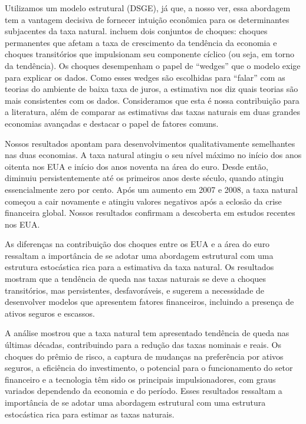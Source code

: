 Utilizamos um modelo estrutural (DSGE), já que, a nosso ver, essa abordagem tem a vantagem decisiva de fornecer intuição econômica para os determinantes subjacentes da taxa natural. incluem dois conjuntos de choques: choques permanentes que afetam a taxa de crescimento da tendência da economia e choques transitórios que impulsionam seu componente cíclico (ou seja, em torno da tendência). Os choques desempenham o papel de “wedges” que o modelo exige para explicar os dados. Como esses wedges são escolhidas para “falar” com as teorias do ambiente de baixa taxa de juros, a estimativa nos diz quais teorias são mais consistentes com os dados. Consideramos que esta é nossa contribuição para a literatura, além de comparar as estimativas das taxas naturais em duas grandes economias avançadas e destacar o papel de fatores comuns.

Nossos resultados apontam para desenvolvimentos qualitativamente semelhantes nas duas economias. A taxa natural atingiu o seu nível máximo no início dos anos oitenta nos EUA e início dos anos noventa na área do euro. Desde então, diminuiu persistentemente até os primeiros anos deste século, quando atingiu essencialmente zero por cento. Após um aumento em 2007 e 2008, a taxa natural começou a cair novamente e atingiu valores negativos após a eclosão da crise financeira global. Nossos resultados confirmam a descoberta em estudos recentes nos EUA.

As diferenças na contribuição dos choques entre os EUA e a área do euro ressaltam a importância de se adotar uma abordagem estrutural com uma estrutura estocástica rica para a estimativa da taxa natural. Os resultados mostram que a tendência de queda nas taxas naturais se deve a choques transitórios, mas persistentes, desfavoráveis, e sugerem a necessidade de desenvolver modelos que apresentem fatores financeiros, incluindo a presença de ativos seguros e escassos.

A análise mostrou que a taxa natural tem apresentado tendência de queda nas últimas décadas, contribuindo para a redução das taxas nominais e reais. Os choques do prêmio de risco, a captura de mudanças na preferência por ativos seguros, a eficiência do investimento, o potencial para o funcionamento do setor financeiro e a tecnologia têm sido os principais impulsionadores, com graus variados dependendo da economia e do período. Esses resultados ressaltam a importância de se adotar uma abordagem estrutural com uma estrutura estocástica rica para estimar as taxas naturais.
\\


